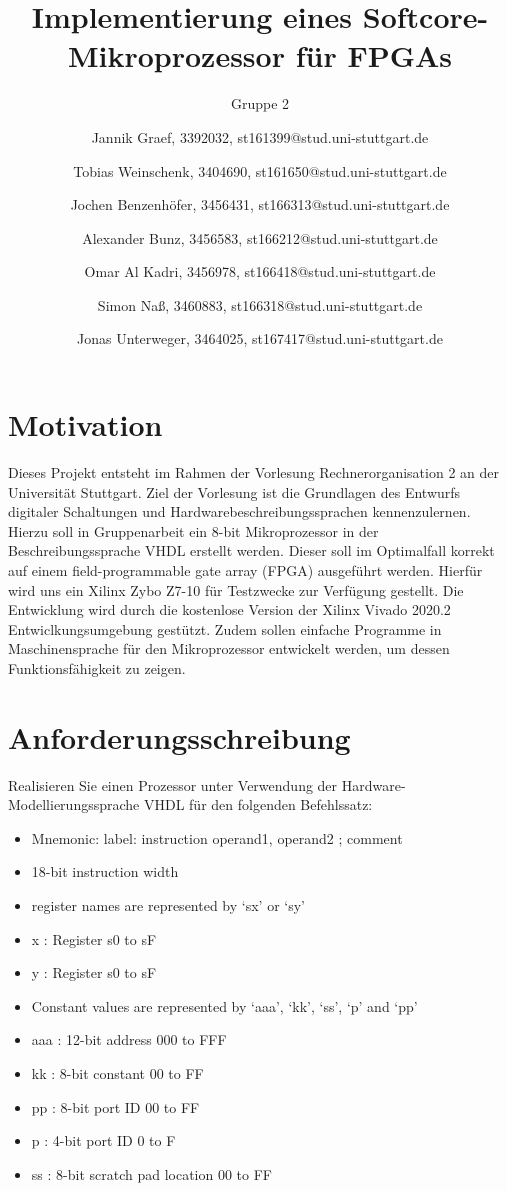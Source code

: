 \documentclass{scrartcl}
\begin{document}
\title{Implementierung eines Softcore-Mikroprozessor für FPGAs}
\subtitle{Gruppe 2}
\author{Jannik Graef, 3392032, st161399@stud.uni-stuttgart.de \and
 Tobias Weinschenk, 3404690, st161650@stud.uni-stuttgart.de \and
 Jochen Benzenhöfer, 3456431, st166313@stud.uni-stuttgart.de \and
 Alexander Bunz, 3456583, st166212@stud.uni-stuttgart.de \and
 Omar Al Kadri, 3456978, st166418@stud.uni-stuttgart.de \and
 Simon Naß, 3460883, st166318@stud.uni-stuttgart.de \and
 Jonas Unterweger, 3464025, st167417@stud.uni-stuttgart.de}
\maketitle
\newpage
\section{Motivation}\label{sec:Motivation}
Dieses Projekt entsteht im Rahmen der Vorlesung Rechnerorganisation 2 an der Universität Stuttgart. Ziel der Vorlesung ist die Grundlagen des Entwurfs digitaler Schaltungen und Hardwarebeschreibungssprachen kennenzulernen. Hierzu soll in Gruppenarbeit ein 8-bit Mikroprozessor in der Beschreibungssprache VHDL erstellt werden. Dieser soll im Optimalfall korrekt auf einem \glqq field-programmable gate array\grqq $ $ (FPGA) ausgeführt werden. Hierfür wird uns ein Xilinx Zybo Z7-10 für Testzwecke zur Verfügung gestellt. Die Entwicklung wird durch die kostenlose Version der Xilinx Vivado 2020.2 Entwiclkungsumgebung gestützt. Zudem sollen einfache Programme in Maschinensprache für den Mikroprozessor entwickelt werden, um dessen Funktionsfähigkeit zu zeigen.

\section{Anforderungsschreibung}\label{sec:Anforderungsschreibung}
Realisieren Sie einen Prozessor unter Verwendung der Hardware-Modellierungssprache VHDL für den folgenden Befehlssatz:

\begin{itemize}
    \item Mnemonic: label: instruction operand1, operand2 ; comment
    \item 18-bit instruction width
    \item register names are represented by ‘sx’ or ‘sy’
    \item x : Register s0 to sF
    \item y : Register s0 to sF
    \item Constant values are represented by ‘aaa’, ‘kk’, ‘ss’, ‘p’ and ‘pp’
    \item aaa : 12-bit address 000 to FFF
    \item kk : 8-bit constant 00 to FF
    \item pp : 8-bit port ID 00 to FF
    \item p : 4-bit port ID 0 to F
    \item ss : 8-bit scratch pad location 00 to FF
\end{itemize}
\end{document}

